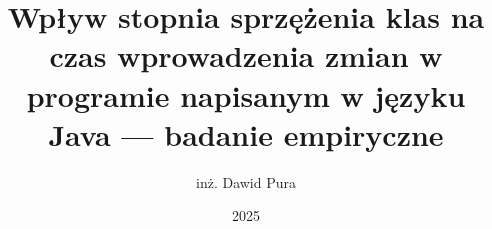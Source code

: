 \documentclass[thesis=mgr,faculty=ee]{EE-dyplom}
\title{
    Wpływ stopnia sprzężenia klas na czas wprowadzenia zmian w programie
    napisanym w języku Java --- badanie empiryczne
}
\author{inż. Dawid Pura}
\date{2025}
\begin{document}
    \frontpages

    

    \bibliografia

    
    \acronymslist
    \listoffigures
    \listoftables
    \easyappendices
\end{document}
